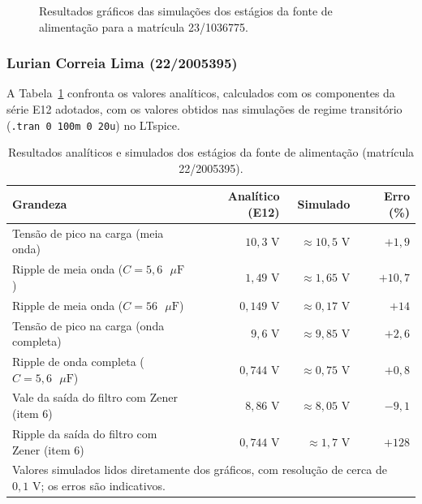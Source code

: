 \documentclass[11pt,a4paper]{article}
\begin{document}
\begin{figure}[H]
    \caption{Resultados gráficos das simulações dos estágios da fonte de alimentação para a matrícula 23/1036775.}
    \label{fig:graficos_daniel}
\end{figure}



\subsubsection{Lurian Correia Lima (22/2005395)}

A Tabela~\ref{tab:resultados_lurian} confronta os valores analíticos, calculados com os componentes da série E12 adotados, com os valores obtidos nas simulações de regime transitório (\texttt{.tran 0 100m 0 20u}) no LTspice.

\begin{table}[H]
    \centering
    \caption{Resultados analíticos e simulados dos estágios da fonte de alimentação (matrícula 22/2005395).}
    \label{tab:resultados_lurian}
    \renewcommand{\arraystretch}{1.2}
    \begin{tabular}{@{}lrrr@{}}
    \toprule
    \textbf{Grandeza} & \textbf{Analítico (E12)} & \textbf{Simulado} & \textbf{Erro (\%)} \\
    \midrule
    Tensão de pico na carga (meia onda) & $10{,}3\text{ V}$ & $\approx 10{,}5\text{ V}$ & $+1{,}9$ \\
    Ripple de meia onda ($C=5{,}6\text{ }\mu\text{F}$) & $1{,}49\text{ V}$ & $\approx 1{,}65\text{ V}$ & $+10{,}7$ \\
    Ripple de meia onda ($C=56\text{ }\mu\text{F}$) & $0{,}149\text{ V}$ & $\approx 0{,}17\text{ V}$ & $+14$ \\
    Tensão de pico na carga (onda completa) & $9{,}6\text{ V}$ & $\approx 9{,}85\text{ V}$ & $+2{,}6$ \\
    Ripple de onda completa ($C=5{,}6\text{ }\mu\text{F}$) & $0{,}744\text{ V}$ & $\approx 0{,}75\text{ V}$ & $+0{,}8$ \\
    Vale da saída do filtro com Zener (item 6) & $8{,}86\text{ V}$ & $\approx 8{,}05\text{ V}$ & $-9{,}1$ \\
    Ripple da saída do filtro com Zener (item 6) & $0{,}744\text{ V}$ & $\approx 1{,}7\text{ V}$ & $+128$ \\
    \bottomrule
    \multicolumn{4}{l}{\footnotesize Valores simulados lidos diretamente dos gráficos, com resolução de cerca de $0{,}1\text{ V}$; os erros são indicativos.}
    \end{tabular}
\end{table}
\end{document}
